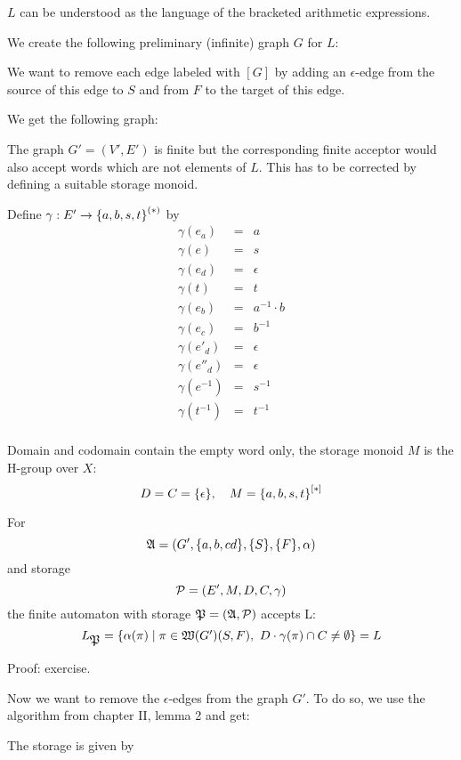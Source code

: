 $L$ can be understood as the language of the bracketed arithmetic expressions.

We create the following preliminary (infinite) graph $G$ for $L$:

\missingfigure

We want to remove each edge labeled with $[G]$ by adding an $\epsilon$-edge
from the source of this edge to $S$ and from $F$ to the target of this edge.

We get the following graph:

\missingfigure

The graph $G'=(V',E')$ is finite but the corresponding finite acceptor would
also accept words which are not elements of $L$. This has to be corrected by defining a
suitable storage monoid.

Define $\gamma: E' \to \mbox{${\mbox{$\{a, b, s, t\}$}}^{(*)}$}$ by
\begin{eqnarray*}
\gamma(e_a) & = & a \\
\gamma(e) & = & s \\
\gamma(e_d) & = & \epsilon \\
\gamma(t) & = & t \\
\gamma(e_b) & = & a^{-1} \cdot b \\
\gamma(e_c) & = & b^{-1} \\
\gamma(e'_d) & = & \epsilon \\
\gamma(e''_d) & = & \epsilon \\
\gamma(e^{-1}) & = & s^{-1} \\
\gamma(t^{-1}) & = & t^{-1} \\
\end{eqnarray*}

Domain and codomain contain the empty word only, the storage monoid $M$ is the
H-group over $X$:
\[ D = C = \mbox{$\{\epsilon\}$},\quad M = \mbox{${\mbox{$\{a, b, s, t\}$}}^{[*]}$} \]

For
\[ \mbox{$\mathfrak{A}$} = (G', \mbox{$\{a, b,c d\}$}, \mbox{$\{S\}$}, \mbox{$\{F\}$}, \alpha) \]
and storage 
\[ \mbox{$\mathcal{P}$} = (E', M, D, C, \gamma) \]
the finite automaton with storage $\mbox{$\mathfrak{P}$} = (\mbox{$\mathfrak{A}$}, \mbox{$\mathcal{P}$})$ accepts L:
\[ L_{\mbox{$\mathfrak{P}$}} = \mbox{$\{\alpha(\pi) \mid \pi \in \mbox{$\mathfrak{W}(G')$}(S, F),\ D \cdot
\gamma(\pi) \cap C \neq \emptyset\}$} = L \]

Proof: exercise.

Now we want to remove the $\epsilon$-edges from the graph $G'$. To do so, we use
the algorithm from chapter II, lemma 2 and get:

\missingfigure

The storage is given by


